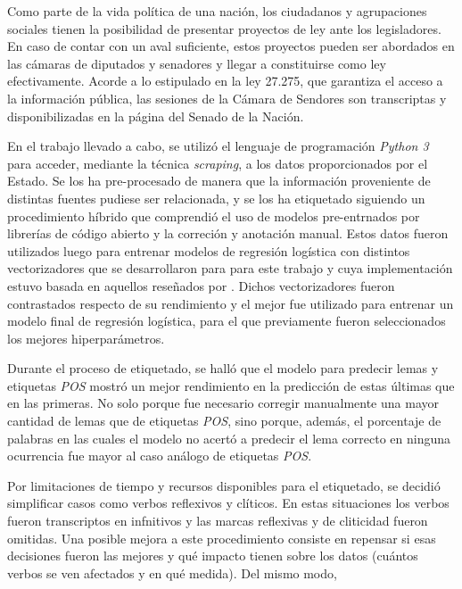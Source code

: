 Como parte de la vida pol\'itica de una naci\'on, los ciudadanos y
agrupaciones sociales tienen la posibilidad de presentar proyectos
de ley ante los legisladores. En caso de contar con un aval suficiente,
estos proyectos pueden ser abordados en las c\'amaras de diputados
y senadores y llegar a constituirse como ley efectivamente.
Acorde a lo estipulado en la ley 27.275, que garantiza el acceso a la
informaci\'on p\'ublica, las sesiones de la C\'amara de Sendores son
transcriptas y disponibilizadas en la p\'agina del Senado de la Naci\'on.
\par
En el trabajo llevado a cabo, se utiliz\'o el lenguaje de
programaci\'on \textit{Python 3} para acceder, mediante la t\'ecnica
\textit{scraping}, a los datos proporcionados por el Estado. Se los ha
pre-procesado de manera que la informaci\'on proveniente de
distintas fuentes pudiese ser relacionada, y se los ha etiquetado
siguiendo un procedimiento h\'ibrido que comprendi\'o el uso de modelos
pre-entrnados por librer\'ias de c\'odigo abierto y la correci\'on y
anotaci\'on manual. Estos datos fueron utilizados luego para entrenar modelos
de regresi\'on log\'istica con distintos vectorizadores que se desarrollaron
para para este trabajo y cuya implementaci\'on estuvo basada en aquellos
reseñados por \cite{monroe2008fightin}. Dichos vectorizadores fueron
contrastados respecto de su rendimiento y el mejor fue utilizado para entrenar
un modelo final de regresi\'on log\'istica, para el que previamente fueron
seleccionados los mejores hiperpar\'ametros.
\par
Durante el proceso de etiquetado, se hall\'o que el modelo para
predecir lemas y etiquetas \textit{POS} mostr\'o un mejor rendimiento
en la predicci\'on de estas \'ultimas que en las primeras. No solo
porque fue necesario corregir manualmente una mayor cantidad de lemas
que de etiquetas \textit{POS}, sino porque, adem\'as, el porcentaje
de palabras en las cuales el modelo no acert\'o a predecir el lema
correcto en ninguna ocurrencia fue mayor al caso an\'alogo de etiquetas
\textit{POS}. 
\par
Por limitaciones de tiempo y recursos disponibles para el etiquetado,
se decidi\'o simplificar casos como verbos reflexivos y cl\'iticos. En
estas situaciones los verbos fueron transcriptos en infnitivos y las
marcas reflexivas y de cliticidad fueron omitidas.
Una posible mejora a este procedimiento consiste en repensar si esas
decisiones fueron las mejores y qu\'e impacto tienen sobre los datos
(cu\'antos verbos se ven afectados y en qu\'e medida). Del mismo modo,
